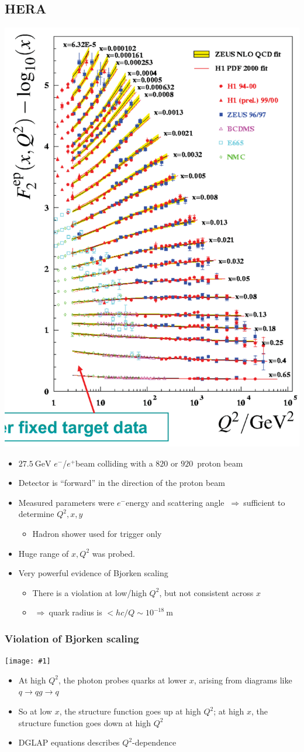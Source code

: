 \documentclass[11pt]{article}
\newcommand{\gev}{\text{GeV}}
\newcommand{\m}{\text{m}}
\newcommand{\el}{\ensuremath{e^{-}}}
\newcommand{\pos}{\ensuremath{e^{+}}}
\newcommand{\thus}{\ensuremath{~\Rightarrow~}}
\newcommand{\embedimgw}[2]{\begin{center}\texttt{[image: \#1]}\end{center}}
\begin{document}
\subsection{HERA}
  \begin{center}  \includegraphics[height=0.7\textwidth,angle=90]{figs/hera.png} \end{center}
\begin{itemize}
  \item $27.5~\gev$ \el/\pos beam colliding with a $820$ or $920$~\gev proton beam
  \item Detector is ``forward'' in the direction of the proton beam
  \item Measured parameters were \el energy and scattering angle \thus sufficient to determine $Q^2,x,y$
  \begin{itemize}
    \item Hadron shower used for trigger only
  \end{itemize}
  \item Huge range of $x,Q^2$ was probed. 
  \item Very powerful evidence of Bjorken scaling 
  \begin{itemize}
    \item There is a violation at low/high $Q^2$, but not consistent across $x$ 
    \item \thus quark radius is $< hc/Q \sim 10^{-18}~\m$
  \end{itemize}
\end{itemize}

\subsubsection{Violation of Bjorken scaling}
\embedimgw{figs/scaleviol.png}{.7}
\begin{itemize}
  \item At high $Q^2$, the photon probes quarks at lower $x$, arising from diagrams like $q\rightarrow qg\rightarrow q$
  \item So at low $x$, the structure function goes up at high $Q^2$; at high $x$, the structure function goes down at high $Q^2$
  \item DGLAP equations describes $Q^2$-dependence
\end{itemize}
\end{document}
